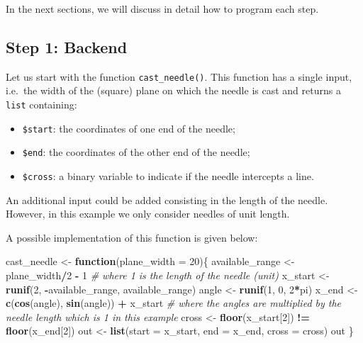 \documentclass[12pt,]{krantz}
\newenvironment{Shaded}{\begin{snugshade}}{\end{snugshade}}
\newcommand{\KeywordTok}[1]{\textcolor[rgb]{0.27,0.27,0.27}{\textbf{#1}}}
\newcommand{\DataTypeTok}[1]{\textcolor[rgb]{0.27,0.27,0.27}{#1}}
\newcommand{\DecValTok}[1]{\textcolor[rgb]{0.06,0.06,0.06}{#1}}
\newcommand{\StringTok}[1]{\textcolor[rgb]{0.5,0.5,0.5}{#1}}
\newcommand{\CommentTok}[1]{\textcolor[rgb]{0.37,0.37,0.37}{\textit{#1}}}
\newcommand{\ControlFlowTok}[1]{\textcolor[rgb]{0.27,0.27,0.27}{\textbf{#1}}}
\newcommand{\OperatorTok}[1]{\textcolor[rgb]{0.43,0.43,0.43}{\textbf{#1}}}
\newcommand{\NormalTok}[1]{#1}
\providecommand{\tightlist}{%
  \setlength{\itemsep}{0pt}\setlength{\parskip}{0pt}}
\let\BeginKnitrBlock\begin \let\EndKnitrBlock\end
\begin{document}
In the next sections, we will discuss in detail how to program each
step.

\subsection{Step 1: Backend}\label{step-1-backend}

Let us start with the function \texttt{cast\_needle()}. This function
has a single input, i.e.~the width of the (square) plane on which the
needle is cast and returns a \texttt{list} containing:

\begin{itemize}
\tightlist
\item
  \texttt{\$start}: the coordinates of one end of the needle;
\item
  \texttt{\$end}: the coordinates of the other end of the needle;
\item
  \texttt{\$cross}: a binary variable to indicate if the needle
  intercepts a line.
\end{itemize}

\BeginKnitrBlock{rmdnote}
An additional input could be added consisting in the length of the
needle. However, in this example we only consider needles of unit
length.
\EndKnitrBlock{rmdnote}

A possible implementation of this function is given below:

\begin{Shaded}
\begin{Highlighting}[]
\NormalTok{cast_needle <-}\StringTok{ }\ControlFlowTok{function}\NormalTok{(}\DataTypeTok{plane_width =} \DecValTok{20}\NormalTok{)\{}
\NormalTok{  available_range <-}\StringTok{ }\NormalTok{plane_width}\OperatorTok{/}\DecValTok{2} \OperatorTok{-}\StringTok{ }\DecValTok{1} \CommentTok{# where 1 is the length of the needle (unit)}
\NormalTok{  x_start <-}\StringTok{ }\KeywordTok{runif}\NormalTok{(}\DecValTok{2}\NormalTok{, }\OperatorTok{-}\NormalTok{available_range, available_range)}
\NormalTok{  angle <-}\StringTok{ }\KeywordTok{runif}\NormalTok{(}\DecValTok{1}\NormalTok{, }\DecValTok{0}\NormalTok{, }\DecValTok{2}\OperatorTok{*}\NormalTok{pi)}
\NormalTok{  x_end <-}\StringTok{ }\KeywordTok{c}\NormalTok{(}\KeywordTok{cos}\NormalTok{(angle), }\KeywordTok{sin}\NormalTok{(angle)) }\OperatorTok{+}\StringTok{ }\NormalTok{x_start }\CommentTok{# where the angles are multiplied by the needle length which is 1 in this example}
\NormalTok{  cross <-}\StringTok{ }\KeywordTok{floor}\NormalTok{(x_start[}\DecValTok{2}\NormalTok{]) }\OperatorTok{!=}\StringTok{ }\KeywordTok{floor}\NormalTok{(x_end[}\DecValTok{2}\NormalTok{])}
\NormalTok{  out <-}\StringTok{ }\KeywordTok{list}\NormalTok{(}\DataTypeTok{start =}\NormalTok{ x_start, }\DataTypeTok{end =}\NormalTok{ x_end, }\DataTypeTok{cross =}\NormalTok{ cross)}
\NormalTok{  out}
\NormalTok{\}}
\end{Highlighting}
\end{Shaded}
\end{document}
